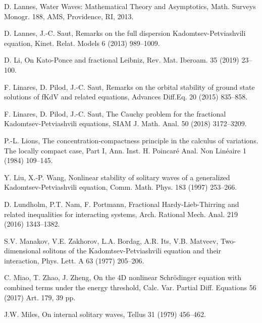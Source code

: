 \documentclass[10pt]{article}
\numberwithin{equation}{section}
\begin{document}
\begin{thebibliography}{00}
			D. Lannes, Water Waves: Mathematical Theory and Asymptotics, Math. Surveys Monogr. 188, AMS, Providence, RI, 2013.
			
			D. Lannes, J.-C. Saut, 
			Remarks on the full dispersion Kadomtsev-Petviashvili equation, 
			Kinet. Relat. Models  6 (2013)  989--1009.  
			
			D. Li,
			On Kato-Ponce and fractional Leibniz,
			Rev. Mat. Iberoam. 35 (2019) 23--100.
			 			
			F. Linares, D. Pilod, J.-C. Saut, Remarks on the orbital stability of ground state
			solutions of fKdV and related equations, Advances Diff.Eq. 20   (2015)  835--858.
			
			
			F. Linares, D. Pilod,   J.-C. Saut,
			The Cauchy problem for the fractional Kadomtsev-Petviashvili equations,
			SIAM J. Math. Anal.  50 (2018) 3172--3209.


			
			  P.-L. Lions,   The concentration-compactness principle in the calculus of variations. The locally compact case, Part I, Ann. Inst. H. Poincar\'e Anal. Non Lin\'eaire 1 (1984) 109--145.
			
			
			
			Y. Liu, X.-P. Wang,  
			Nonlinear stability of solitary waves of a generalized Kadomtsev-Petviashvili equation,
			Comm. Math. Phys. 183 (1997) 253--266.
			
			D. Lundholm, P.T. Nam, F. Portmann,
			Fractional Hardy-Lieb-Thirring and related inequalities   for interacting systems,
			Arch. Rational Mech. Anal. 219 (2016)  1343--1382.
			
			
			 S.V. Manakov, V.E. Zakhorov, L.A. Bordag, A.R. Its, V.B. Matveev, Two-dimensional solitons of the Kadomtsev-Petviashvili equation and their interaction, 
			Phys. Lett. A 63 (1977) 205--206.
			
			
			
			C. Miao, T. Zhao, J. Zheng,
			On the 4D nonlinear Schr\"{o}dinger equation with combined terms under the energy threshold,
			Calc. Var. Partial Diff. Equations 56 (2017)  Art. 179, 39 pp.
			
			J.W. Miles, 
			On internal solitary waves,
			Tellus 31 (1979) 456--462.
			

\end{thebibliography}
\end{document}
